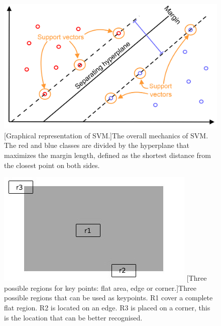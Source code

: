 \begin{figure}
	\centering
	\begin{minipage}{.59\textwidth}
		\centering
		\includegraphics[width=1\linewidth]{images/recognition/howItWorks_svm}
		[Graphical representation of SVM.]{The overall mechanics of SVM. The red and blue classes are divided by the hyperplane that maximizes the margin length, defined as the shortest distance from the closest point on both sides.}
		\label{fig:howItWorks_svm}
	\end{minipage}
	\begin{minipage}{.39\textwidth}
		\centering
		\includegraphics[width=1\linewidth]{images/recognition/kpMatch_regions}
		\captionsetup{margin=0.5cm}
		[Three possible regions for key points: flat area, edge or corner.]{Three possible regions that can be used as keypoints. R1 cover a complete flat region. R2 is located on an edge. R3 is placed on a corner, this is the location that can be better recognised.}
		\label{fig:kpMatch_regions}
	\end{minipage}
\end{figure}

